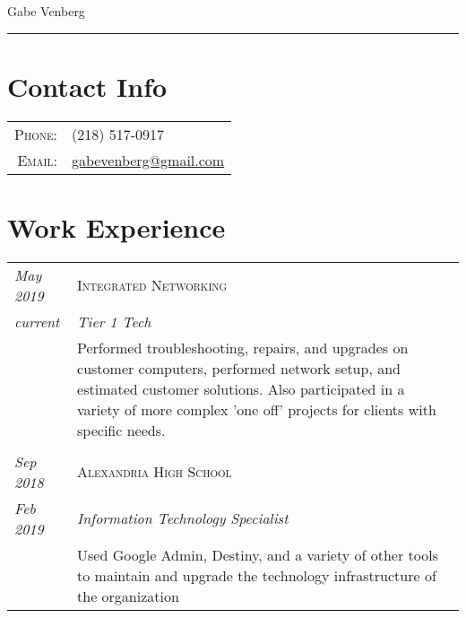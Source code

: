 \documentclass[letterpaper,10pt]{article}
\begin{document}
\pagestyle{empty}%

	\par{\centering
		{\huge Gabe Venberg
	}\bigskip\par}
\hrule
\section*{Contact Info}
	\begin{tabular}{rl}
	\textsc{Phone:} & (218) 517-0917\\
	\textsc{Email:} & \href{mailto:gabevenberg@gmail.com}{gabevenberg@gmail.com}\\
	\end{tabular}
\section*{Work Experience}
	\begin{tabular}{R{2cm}|p{14cm}}
	\textsl{May 2019} & \textsc{Integrated Networking}\\
	\textsl{current} & \emph{Tier 1 Tech}\\
	& Performed troubleshooting, repairs, and upgrades on customer computers, performed network setup, and estimated customer solutions.
	Also participated in a variety of more complex 'one off' projects for clients with specific needs.\\
	\\
	\textsl{Sep 2018}	& \textsc{Alexandria High School}\\
	\textsl{Feb 2019}	& \emph{Information Technology Specialist}\\
	& Used Google Admin, Destiny, and a variety of other tools to maintain and upgrade the technology infrastructure of the organization\\
	\end{tabular}
\end{document}
